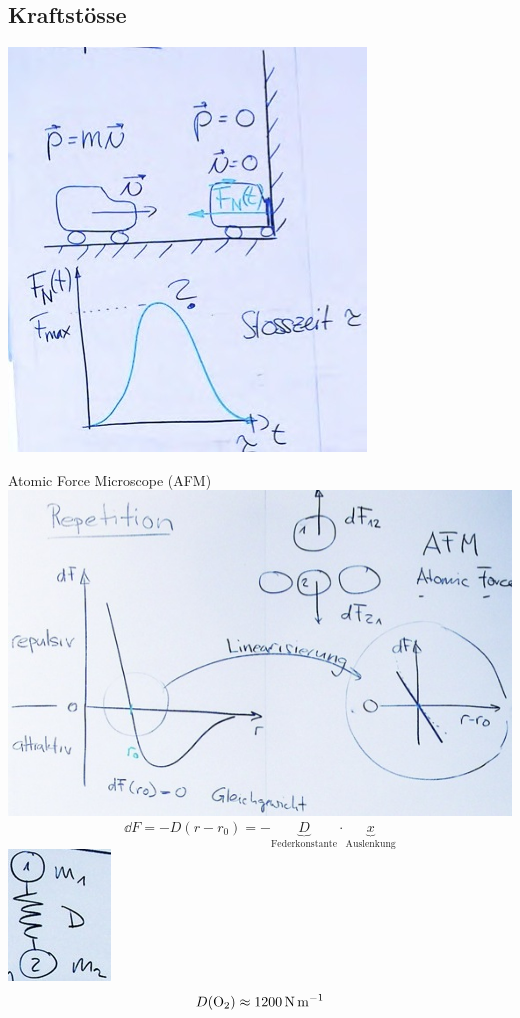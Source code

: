 \subsection{Kraftstösse}
\includegraphics{Bild30}
\begin{rep*}
	Atomic Force Microscope (AFM) \\
	\includegraphics{Bild31}
	\[ \dd F =  -D ( r - r_0 ) = -\underbrace{D}_{\text{Federkonstante}} \cdot \underbrace{x}_{\text{Auslenkung}} \]
	\includegraphics{Bild32}
	\[ D( \ce{O2} ) \approx \SI{1200}{\newton\per\metre} \]
\end{rep*}
